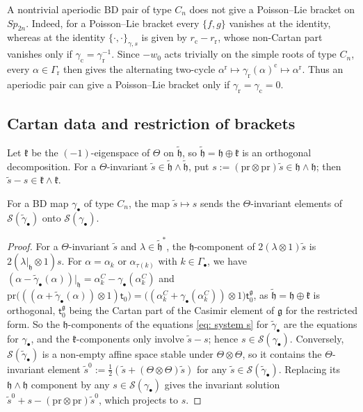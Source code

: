 \documentclass[a4paper]{amsart}
\numberwithin{equation}{section}
\theoremstyle{definition}
\theoremstyle{remark}
\newcommand{\mfh}{\mathfrak{h}}
\newcommand{\mfg}{\mathfrak{g}}
\newcommand{\mfk}{\mathfrak{k}}
\newcommand{\mcS}{\mathcal{S}}
\newcommand{\tg}{\widetilde{\gamma}}
\newcommand{\Vt}{\Theta}
\newcommand{\rr}{\mathrm{r}}
\newcommand{\cc}{\mathrm{c}}
\newcommand{\pr}{\mathrm{pr}}
\newcommand{\Cas}{\mathsf t}
\newcommand{\Sp}{Sp_{2n}}
\begin{document}
\begin{remark}
  \label{rmk: aperiodic not PL}
  A nontrivial aperiodic BD pair of type $C_n$ does not give a Poisson--Lie bracket on $\Sp$.
  Indeed, for a Poisson--Lie bracket every $\{f,g\}$ vanishes at the identity, whereas at the identity $\{\cdot,\cdot\}_{\gamma,s}$ is given by $r_\cc-r_\rr$, whose non-Cartan part vanishes only if $\gamma_{\cc}=\gamma_{\rr}^{-1}$.
  Since $-w_0$ acts trivially on the simple roots of type $C_n$, every $\alpha\in\Gamma_{\rr}$ then gives the alternating two-cycle $\alpha^\rr\mapsto\gamma_{\rr}(\alpha)^\cc\mapsto\alpha^\rr$.
  Thus an aperiodic pair can give a Poisson--Lie bracket only if $\gamma_{\rr}=\gamma_{\cc}=0$.
\end{remark}

\subsection{Cartan data and restriction of brackets}
Let $\mfk$ be the $(-1)$-eigenspace of $\Vt$ on $\widetilde{\mfh}$, so $\widetilde{\mfh}=\mfh\oplus\mfk$ is an orthogonal decomposition.
For a $\Vt$-invariant $\widetilde{s}\in\widetilde{\mfh}\wedge\widetilde{\mfh}$, put $s:=(\pr\otimes\pr)\widetilde{s}\in\mfh\wedge\mfh$; then $\widetilde{s}-s\in\mfk\wedge\mfk$.

\begin{proposition}
  \label{prop: cartan}
  For a BD map $\gamma_\bullet$ of type $C_n$, the map $\widetilde{s}\mapsto s$ sends the $\Vt$-invariant elements of $\mcS(\tg_\bullet)$ onto $\mcS(\gamma_\bullet)$.
\end{proposition}
\begin{proof}

  For a $\Vt$-invariant $\widetilde{s}$ and $\lambda\in\widetilde{\mfh}^*$, the $\mfh$-component of $2(\lambda\otimes1)\widetilde{s}$ is $2(\lambda|_\mfh\otimes1)s$.
  For $\alpha=\alpha_k$ or $\alpha_{\tau(k)}$ with $k\in\Gamma_\bullet$, we have $(\alpha-\tg_\bullet(\alpha))|_\mfh=\alpha^C_k-\gamma_\bullet(\alpha^C_k)$ and $\pr\big(((\alpha+\tg_\bullet(\alpha))\otimes1)\Cas_0\big)=\big((\alpha^C_k+\gamma_\bullet(\alpha^C_k))\otimes1\big)\Cas^\mfg_0$, as $\widetilde{\mfh}=\mfh\oplus\mfk$ is orthogonal, $\Cas^\mfg_0$ being the Cartan part of the Casimir element of $\mfg$ for the restricted form.
  So the $\mfh$-components of the equations \eqref{eq: system s} for $\tg_\bullet$ are the equations for $\gamma_\bullet$, and the $\mfk$-components only involve $\widetilde{s}-s$; hence $s\in\mcS(\gamma_\bullet)$.
  Conversely, $\mcS(\tg_\bullet)$ is a non-empty affine space stable under $\Vt\otimes\Vt$, so it contains the $\Vt$-invariant element $\widetilde{s}^0:=\frac12(\widetilde{s}+(\Vt\otimes\Vt)\widetilde{s})$ for any $\widetilde{s}\in\mcS(\tg_\bullet)$.
  Replacing its $\mfh\wedge\mfh$ component by any $s\in\mcS(\gamma_\bullet)$ gives the invariant solution $\widetilde{s}^0+s-(\pr\otimes\pr)\widetilde{s}^0$, which projects to $s$.
\end{proof}
\end{document}
